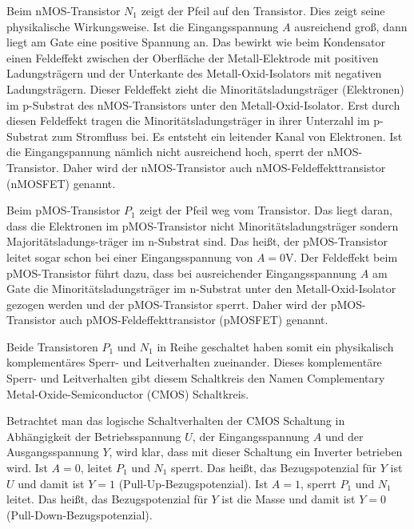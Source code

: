 \documentclass{scrarticle}
\numberwithin{equation}{section}
\begin{document}
Beim nMOS-Transistor $N_1$ zeigt der Pfeil auf den Transistor. Dies zeigt seine physikalische Wirkungsweise. Ist die Eingangsspannung $A$ ausreichend groß, dann liegt am Gate eine positive Spannung an. Das bewirkt wie beim Kondensator einen Feldeffekt zwischen der Oberfläche der Metall-Elektrode mit positiven Ladungsträgern und der Unterkante des Metall-Oxid-Isolators mit negativen Ladungsträgern. Dieser Feldeffekt zieht die Minoritätsladungsträger (Elektronen) im p-Substrat des nMOS-Transistors unter den Metall-Oxid-Isolator. Erst durch diesen Feldeffekt tragen die Minoritätsladungsträger in ihrer Unterzahl im p-Substrat zum Stromfluss bei. Es entsteht ein leitender Kanal von Elektronen. Ist die Eingangspannung nämlich nicht ausreichend hoch, sperrt der nMOS-Transistor. Daher wird der nMOS-Transistor auch nMOS-Feldeffekttransistor (nMOSFET) genannt.

Beim pMOS-Transistor $P_1$ zeigt der Pfeil weg vom Transistor. Das liegt daran, dass die Elektronen im pMOS-Transistor nicht Minoritätsladungsträger sondern Majoritätsladungs-träger im n-Substrat sind. Das heißt, der pMOS-Transistor leitet sogar schon bei einer Eingangsspannung von $A = 0\mathrm{V}$. Der Feldeffekt beim pMOS-Transistor führt dazu, dass bei ausreichender Eingangsspannung $A$ am Gate die Minoritätsladungsträger im n-Substrat unter den Metall-Oxid-Isolator gezogen werden und der pMOS-Transistor sperrt. Daher wird der pMOS-Transistor auch pMOS-Feldeffekttransistor (pMOSFET) genannt.

Beide Transistoren $P_1$ und $N_1$ in Reihe geschaltet haben somit ein physikalisch komplementäres Sperr- und Leitverhalten zueinander. Dieses komplementäre Sperr- und Leitverhalten gibt diesem Schaltkreis den Namen Complementary Metal-Oxide-Semiconductor (CMOS) Schaltkreis.

Betrachtet man das logische Schaltverhalten der CMOS Schaltung in Abhängigkeit der Betriebsspannung $U$, der Eingangsspannung $A$ und der Ausgangsspannung $Y$, wird klar, dass mit dieser Schaltung ein Inverter betrieben wird. Ist $A = 0$, leitet $P_1$ und $N_1$ sperrt. Das heißt, das Bezugspotenzial für $Y$ ist $U$ und damit ist $Y = 1$ (Pull-Up-Bezugspotenzial). Ist $A = 1$, sperrt $P_1$ und $N_1$ leitet. Das heißt, das Bezugspotenzial für $Y$ ist die Masse und damit ist $Y = 0$ (Pull-Down-Bezugspotenzial).
\end{document}
